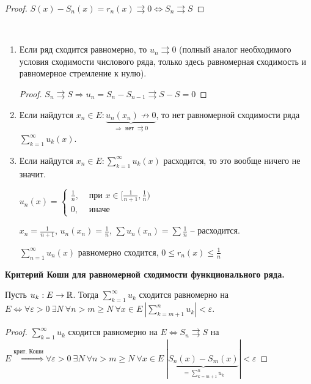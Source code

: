 \begin{proof}
    $S(x)-S_n(x)=r_n(x)\rightrightarrows 0\Leftrightarrow S_n \rightrightarrows S$
\end{proof}

\begin{remark}~
    \begin{enumerate}
        \item Если ряд сходится равномерно, то $u_n\rightrightarrows 0$ (полный аналог необходимого условия сходимости числового ряда, только здесь равномерная сходимость и равномерное стремление к нулю).
        \begin{proof}
            $S_n\rightrightarrows S\Rightarrow u_n=S_n-S_{n-1}\rightrightarrows S - S = 0$
        \end{proof}
        \item Если найдутся $x_n\in E: \underbrace{u_n(x_n)\not \rightarrow 0}_{\Rightarrow\text{ нет }\rightrightarrows 0}$, то нет равномерной сходимости ряда $\sum\limits_{k=1}^\infty u_k(x)$. 
        \item Если найдутся $x_n\in E: \sum\limits_{k=1}^\infty u_k(x)$ расходится, то это вообще ничего не значит.
        \begin{example}
            $u_n(x)=\left\{\begin{array}{ll} \frac{1}{n},&\text{ при } x\in [\frac{1}{n+1}, \frac{1}{n}) \\ 0,&\text{  иначе}
    \end{array}\right.$

        $x_n=\frac{1}{n+1}$, $u_n(x_n)=\frac{1}{n}$, $\sum u_n(x_n)=\sum \frac{1}{n}$ – расходится.

        $\sum\limits_{n=1}^\infty u_n(x)$ равномерно сходится, $0\leq r_n(x)\leq \frac{1}{n}$
        \end{example}
    \end{enumerate}
\end{remark}

\begin{theorem}
    \textbf{Критерий Коши для равномерной сходимости функционального ряда.}

    Пусть $u_k: E\rightarrow \mathbb{R}$. Тогда $\sum\limits_{k=1}^\infty u_k$ сходится равномерно на $E\Leftrightarrow \forall \varepsilon > 0\ \exists N\ \forall n> m\geq N\ \forall x\in E\ |\sum\limits_{k=m+1}^n u_k|< \varepsilon$.
\end{theorem}

\begin{proof}
    $\sum\limits_{k=1}^\infty u_k$ сходится равномерно на $E\Leftrightarrow S_n\rightrightarrows S $ на $E\overset{\text{крит. Коши}}{\Leftrightarrow} \forall \varepsilon > 0\ \exists N\ \forall n> m\geq N\ \forall x\in E\ |\underbrace{S_n(x)-S_m(x)}_{=\sum\limits_{k=m+1}^n u_k}|<\varepsilon$
\end{proof}

